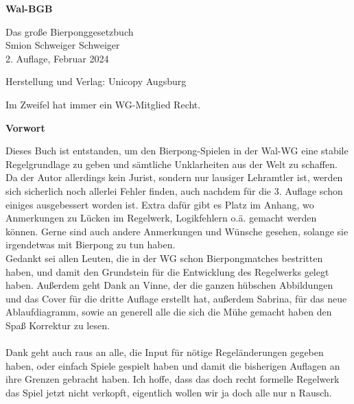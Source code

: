 \documentclass[a5paper, 12pt]{book}
\begin{document}
\renewcommand{\listfigurename}{Abbildungs- verzeichnis}
\begin{titlepage}
\begin{center}
{\fontsize{40}{48}\selectfont \textbf{Wal-BGB}\par}

\begin{large}
\vspace{0.3cm}
Das große Bierponggesetzbuch\\
\vspace{1cm}
Smion Schweiger Schweiger\\
\vspace{1cm}
2. Auflage, Februar 2024
\end{large}
\end{center}
\vspace{6cm}
Herstellung und Verlag: Unicopy Augsburg
\end{titlepage}

\begin{center}
\vspace*{2.5cm}
\par
\smallskip
\large{Im Zweifel hat immer ein WG-Mitglied Recht.}
\end{center}
\restoregeometry
\pagebreak
\begin{Large} \textbf{Vorwort\\}
\end{Large}
Dieses Buch ist entstanden, um den Bierpong-Spielen in der Wal-WG eine stabile Regelgrundlage zu geben und sämtliche Unklarheiten aus der Welt zu schaffen. Da der Autor allerdings kein Jurist, sondern nur lausiger Lehramtler ist, werden sich sicherlich noch allerlei Fehler finden, auch nachdem für die 3. Auflage schon einiges ausgebessert worden ist. Extra dafür gibt es Platz im Anhang, wo Anmerkungen zu Lücken im Regelwerk, Logikfehlern o.ä. gemacht werden können. Gerne sind auch andere Anmerkungen und Wünsche gesehen, solange sie irgendetwas mit Bierpong zu tun haben.\\
Gedankt sei allen Leuten, die in der WG schon Bierpongmatches bestritten haben, und damit den Grundstein für die Entwicklung des Regelwerks gelegt haben. Außerdem geht Dank an Vinne, der die ganzen hübschen Abbildungen und das Cover für die dritte Auflage erstellt hat, außerdem Sabrina, für das neue Ablaufdiagramm, sowie an generell alle die sich die Mühe gemacht haben den Spaß Korrektur zu lesen.\\\\
Dank geht auch raus an alle, die Input für nötige Regeländerungen gegeben haben, oder einfach Spiele gespielt haben und damit die bisherigen Auflagen an ihre Grenzen gebracht haben.
Ich hoffe, dass das doch recht formelle Regelwerk das Spiel jetzt nicht verkopft, eigentlich wollen wir ja doch alle nur n Rausch.
\end{document}
